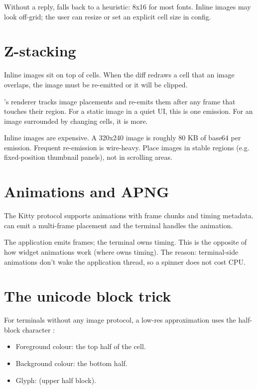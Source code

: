 Without a reply, \maya{} falls back to a heuristic: 8x16 for
most fonts. Inline images may look off-grid; the user can
resize or set an explicit cell size in config.

\section{Z-stacking}

Inline images sit on top of cells. When the diff redraws a
cell that an image overlaps, the image must be re-emitted or
it will be clipped.

\maya{}'s renderer tracks image placements and re-emits them
after any frame that touches their region. For a static image
in a quiet UI, this is one emission. For an image surrounded
by changing cells, it is more.

\begin{warning}
Inline images are expensive. A 320x240 image is roughly 80 KB
of base64 per emission. Frequent re-emission is wire-heavy.
Place images in stable regions (e.g. fixed-position thumbnail
panels), not in scrolling areas.
\end{warning}

\section{Animations and APNG}

The Kitty protocol supports animations with frame chunks and
timing metadata. \maya{} can emit a multi-frame placement and
the terminal handles the animation.

The application emits frames; the terminal owns timing. This is
the opposite of how widget animations work (where \maya{} owns
timing). The reason: terminal-side animations don't wake the
application thread, so a spinner does not cost CPU.

\section{The unicode block trick}

For terminals without any image protocol, a low-res
approximation uses the half-block character :

\begin{itemize}[leftmargin=*]
  \item Foreground colour: the top half of the cell.
  \item Background colour: the bottom half.
  \item Glyph:  (upper half block).
\end{itemize}

